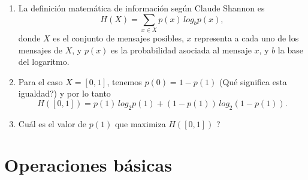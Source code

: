 \begin{enumerate}
\item La definici\'{o}n matem\'{a}tica de informaci\'{o}n seg\'{u}n
  Claude Shannon es
\begin{equation}
  H(X) = \sum_{x \in X} p(x) \, log_{b} p(x),
\end{equation}
donde $X$ es el conjunto de mensajes posibles, $x$ representa a cada
uno de los mensajes de $X$, y $p(x)$ es la probabilidad asociada al
mensaje $x$, y $b$ la base del logaritmo.

\item Para el caso $X = [0, 1]$, tenemos $p(0) = 1 - p(1)$
(\textquestiondown Qu\'{e} significa esta igualdad?) y por lo tanto
\begin{equation}
  H([0,1]) = p(1) \, log_{2} p(1) + (1 - p(1)) \, log_{2} (1 - p(1)).
\end{equation}

\item \textquestiondown Cu\'{a}l es el valor de $p(1)$ que maximiza
  $H([0,1])$ ? 

\end{enumerate}

%
%
%
%

\section{Operaciones b\'{a}sicas}

